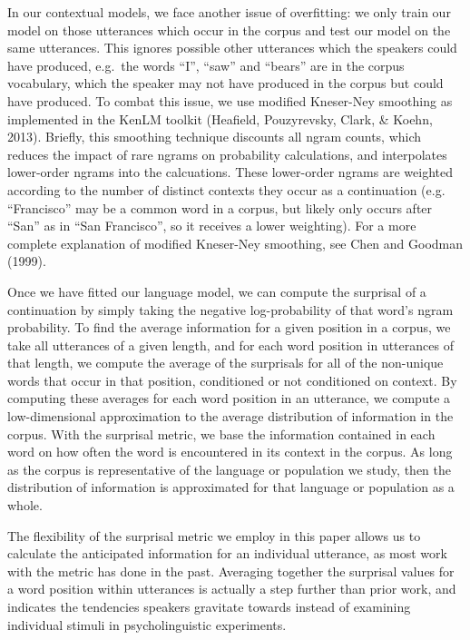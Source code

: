 \documentclass[man,floatsintext]{apa6}
\begin{document}
In our contextual models, we face another issue of overfitting: we only train our model on those utterances which occur in the corpus and test our model on the same utterances. This ignores possible other utterances which the speakers could have produced, e.g.~the words \enquote{I}, \enquote{saw} and \enquote{bears} are in the corpus vocabulary, which the speaker may not have produced in the corpus but could have produced. To combat this issue, we use modified Kneser-Ney smoothing as implemented in the KenLM toolkit (Heafield, Pouzyrevsky, Clark, \& Koehn, 2013). Briefly, this smoothing technique discounts all ngram counts, which reduces the impact of rare ngrams on probability calculations, and interpolates lower-order ngrams into the calcuations. These lower-order ngrams are weighted according to the number of distinct contexts they occur as a continuation (e.g. \enquote{Francisco} may be a common word in a corpus, but likely only occurs after \enquote{San} as in \enquote{San Francisco}, so it receives a lower weighting). For a more complete explanation of modified Kneser-Ney smoothing, see Chen and Goodman (1999).

Once we have fitted our language model, we can compute the surprisal of a continuation by simply taking the negative log-probability of that word's ngram probability. To find the average information for a given position in a corpus, we take all utterances of a given length, and for each word position in utterances of that length, we compute the average of the surprisals for all of the non-unique words that occur in that position, conditioned or not conditioned on context. By computing these averages for each word position in an utterance, we compute a low-dimensional approximation to the average distribution of information in the corpus. With the surprisal metric, we base the information contained in each word on how often the word is encountered in its context in the corpus. As long as the corpus is representative of the language or population we study, then the distribution of information is approximated for that language or population as a whole.

The flexibility of the surprisal metric we employ in this paper allows us to calculate the anticipated information for an individual utterance, as most work with the metric has done in the past. Averaging together the surprisal values for a word position within utterances is actually a step further than prior work, and indicates the tendencies speakers gravitate towards instead of examining individual stimuli in psycholinguistic experiments.
\end{document}

